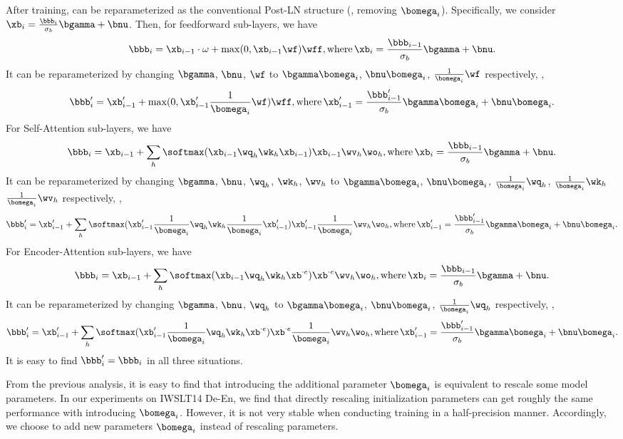 After training, \our can be reparameterized as the conventional Post-LN structure (\ie, removing $\bomega_i$). 
Specifically, we consider $\xb_i = \frac{\bbb_i}{\sigma_{b}}\bgamma + \bnu$. 
Then, for feedforward sub-layers, we have
$$
\bbb_{i} = \xb_{i-1} \cdot \omega +\max(0, \xb_{i-1}\wf)\wff, \mbox{where}\, \xb_{i} = \frac{\bbb_{i-1}}{\sigma_b}\bgamma + \bnu. 
$$
It can be reparameterized by changing $\bgamma$, $\bnu$, $\wf$ to $\bgamma\bomega_i$, $\bnu\bomega_i$, $\frac{1}{\bomega_i}\wf$ respectively, \ie, 
$$
\bbb'_{i} = \xb'_{i-1} + \max(0, \xb'_{i-1}\frac{1}{\bomega_i}\wf)\wff, \mbox{where}\, \xb'_{i-1} = \frac{\bbb'_{i-1}}{\sigma_{b}}\bgamma\bomega_i + \bnu\bomega_i. 
$$
For Self-Attention sub-layers, we have 
$$
\bbb_{i} = \xb_{i-1} + \sum_{h} \softmax(\xb_{i-1} \wq_h \wk_h \xb_{i-1})\xb_{i-1} \wv_h \wo_h, \mbox{where}\, \xb_{i} = \frac{\bbb_{i-1}}{\sigma_b}\bgamma + \bnu.
$$ 
It can be reparameterized by changing $\bgamma$, $\bnu$, $\wq_h$, $\wk_h$, $\wv_h$ to $\bgamma\bomega_i$, $\bnu\bomega_i$, $\frac{1}{\bomega_i}\wq_h$, $\frac{1}{\bomega_i}\wk_h$ $\frac{1}{\bomega_i}\wv_h$ respectively, \ie, 
$$
\bbb'_{i} = \xb'_{i-1} + \sum_{h} \softmax(\xb'_{i-1} \frac{1}{\bomega_i}\wq_h \wk_h \frac{1}{\bomega_i}\xb'_{i-1})\xb'_{i-1} \frac{1}{\bomega_i}\wv_h \wo_h, \mbox{where}\, \xb'_{i-1} = \frac{\bbb'_{i-1}}{\sigma_{b}}\bgamma\bomega_i + \bnu\bomega_i.
$$
For Encoder-Attention sub-layers, we have 
$$
\bbb_{i} = \xb_{i-1} + \sum_{h} \softmax(\xb_{i-1} \wq_h \wk_h \xb^{\cdot e})\xb^{\cdot e} \wv_h \wo_h, \mbox{where}\, \xb_{i} = \frac{\bbb_{i-1}}{\sigma_b}\bgamma + \bnu.
$$ 
It can be reparameterized by changing $\bgamma$, $\bnu$, $\wq_h$ to $\bgamma\bomega_i$, $\bnu\bomega_i$, $\frac{1}{\bomega_i}\wq_h$ respectively, \ie, 
$$
\bbb'_{i} = \xb'_{i-1} + \sum_{h} \softmax(\xb'_{i-1} \frac{1}{\bomega_i}\wq_h \wk_h \xb^{\cdot e})\xb^{\cdot e} \frac{1}{\bomega_i}\wv_h \wo_h, \mbox{where}\, \xb'_{i-1} = \frac{\bbb'_{i-1}}{\sigma_{b}}\bgamma\bomega_i + \bnu\bomega_i.
$$
It is easy to find $\bbb'_i = \bbb_i$ in all three situations. 

From the previous analysis, it is easy to find that introducing the additional parameter $\bomega_i$ is equivalent to rescale some model parameters. 
In our experiments on IWSLT14 De-En, we find that directly rescaling initialization parameters can get roughly the same performance with introducing $\bomega_i$. 
However, it is not very stable when conducting training in a half-precision manner. 
Accordingly, we choose to add new parameters $\bomega_i$ instead of rescaling parameters. 

